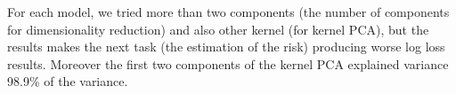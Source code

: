 		For each model, we tried more than two components (the number of components for dimensionality reduction) and also other kernel (for kernel PCA), but the results makes the next task (the estimation of the risk) producing worse log loss results. Moreover the first two components of the kernel PCA explained variance 98.9\% of the variance.